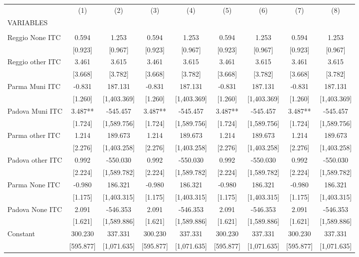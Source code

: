 \begin{tabular}{lcccccccc} \hline
 & (1) & (2) & (3) & (4) & (5) & (6) & (7) & (8) \\
VARIABLES &  &  &  &  &  &  &  &  \\ \hline
 &  &  &  &  &  &  &  &  \\
Reggio None ITC & 0.594 & 1.253 & 0.594 & 1.253 & 0.594 & 1.253 & 0.594 & 1.253 \\
 & [0.923] & [0.967] & [0.923] & [0.967] & [0.923] & [0.967] & [0.923] & [0.967] \\
Reggio other ITC & 3.461 & 3.615 & 3.461 & 3.615 & 3.461 & 3.615 & 3.461 & 3.615 \\
 & [3.668] & [3.782] & [3.668] & [3.782] & [3.668] & [3.782] & [3.668] & [3.782] \\
Parma Muni ITC & -0.831 & 187.131 & -0.831 & 187.131 & -0.831 & 187.131 & -0.831 & 187.131 \\
 & [1.260] & [1,403.369] & [1.260] & [1,403.369] & [1.260] & [1,403.369] & [1.260] & [1,403.369] \\
Padova Muni ITC & 3.487** & -545.457 & 3.487** & -545.457 & 3.487** & -545.457 & 3.487** & -545.457 \\
 & [1.724] & [1,589.756] & [1.724] & [1,589.756] & [1.724] & [1,589.756] & [1.724] & [1,589.756] \\
Parma other ITC & 1.214 & 189.673 & 1.214 & 189.673 & 1.214 & 189.673 & 1.214 & 189.673 \\
 & [2.276] & [1,403.258] & [2.276] & [1,403.258] & [2.276] & [1,403.258] & [2.276] & [1,403.258] \\
Padova other ITC & 0.992 & -550.030 & 0.992 & -550.030 & 0.992 & -550.030 & 0.992 & -550.030 \\
 & [2.224] & [1,589.782] & [2.224] & [1,589.782] & [2.224] & [1,589.782] & [2.224] & [1,589.782] \\
Parma None ITC & -0.980 & 186.321 & -0.980 & 186.321 & -0.980 & 186.321 & -0.980 & 186.321 \\
 & [1.175] & [1,403.315] & [1.175] & [1,403.315] & [1.175] & [1,403.315] & [1.175] & [1,403.315] \\
Padova None ITC & 2.091 & -546.353 & 2.091 & -546.353 & 2.091 & -546.353 & 2.091 & -546.353 \\
 & [1.621] & [1,589.886] & [1.621] & [1,589.886] & [1.621] & [1,589.886] & [1.621] & [1,589.886] \\
Constant & 300.230 & 337.331 & 300.230 & 337.331 & 300.230 & 337.331 & 300.230 & 337.331 \\
 & [595.877] & [1,071.635] & [595.877] & [1,071.635] & [595.877] & [1,071.635] & [595.877] & [1,071.635] \\

\end{tabular}
